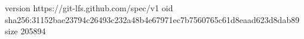 version https://git-lfs.github.com/spec/v1
oid sha256:31152bae23794c26493c232a48b4e67971ec7b7560765c61d8eaad623d8dab89
size 205894
